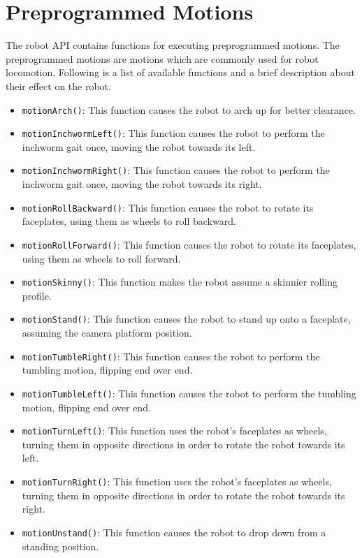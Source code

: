\documentclass{article}
\begin{document}
\section{\label{sec:preprogrammed_motions}Preprogrammed Motions}
The robot API contains functions for executing preprogrammed motions. The 
preprogrammed motions are motions which are commonly used for robot locomotion.
Following is a list of available functions and a brief description about
their effect on the robot.
\begin{itemize}
\item \texttt{motionArch()}: This function causes the robot to arch up for better 
clearance.
\item \texttt{motionInchwormLeft()}: This function causes the robot to perform
  the inchworm gait once, moving the robot towards its left.
\item \texttt{motionInchwormRight()}: This function causes the robot to perform
  the inchworm gait once, moving the robot towards its right.
\item \texttt{motionRollBackward()}: This function causes the robot to rotate
  its faceplates, using them as wheels to roll backward.
\item \texttt{motionRollForward()}: This function causes the robot to rotate
  its faceplates, using them as wheels to roll forward.
\item \texttt{motionSkinny()}: This function makes the robot assume a skinnier
rolling profile.
\item \texttt{motionStand()}: This function causes the robot to stand up onto a 
  faceplate, assuming the camera platform position.
\item \texttt{motionTumbleRight()}: This function causes the robot to perform the
tumbling motion, flipping end over end.
\item \texttt{motionTumbleLeft()}: This function causes the robot to perform the
tumbling motion, flipping end over end.
\item \texttt{motionTurnLeft()}: This function uses the robot's faceplates as wheels, turning
  them in opposite directions in order to rotate the robot towards its left.
\item \texttt{motionTurnRight()}: This function uses the robot's faceplates as wheels, turning
  them in opposite directions in order to rotate the robot towards its right.
\item \texttt{motionUnstand()}: This function causes the robot to drop down from a standing position.
\end{itemize}
\end{document}
